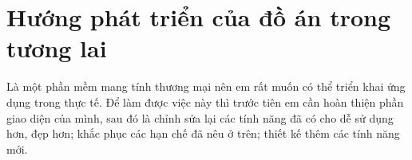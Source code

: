 \section{Hướng phát triển của đồ án trong tương lai}
Là một phần mềm mang tính thương mại nên em rất muốn có thể
triển khai ứng dụng trong thực tế. Để làm được việc này thì trước tiên
em cần hoàn thiện phần giao diện của mình, sau đó là chỉnh sửa lại
các tính năng đã có cho dễ sử dụng hơn, đẹp hơn; khắc phục
các hạn chế đã nêu ở trên; thiết kế thêm các tính năng mới.
